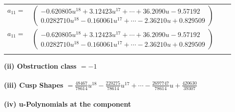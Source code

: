 \documentclass[1p]{elsarticle_modified}
\theoremstyle{definition}
\begin{document}
\begin{tabular}{m{7pt} m{180pt} m{7pt} m{180pt} }
\flushright $a_{11}=$&$\begin{pmatrix}-0.620805 u^{18}+3.12423 u^{17}+\cdots+36.2090 u-9.57192\\0.0282710 u^{18}-0.160061 u^{17}+\cdots-2.36210 u+0.829509\end{pmatrix}$\\ \flushright $a_{11}=$&$\begin{pmatrix}-0.620805 u^{18}+3.12423 u^{17}+\cdots+36.2090 u-9.57192\\0.0282710 u^{18}-0.160061 u^{17}+\cdots-2.36210 u+0.829509\end{pmatrix}$\\&\end{tabular}
\flushleft \textbf{(ii) Obstruction class $= -1$}\\~\\
\flushleft \textbf{(iii) Cusp Shapes $= \frac{48467}{78614} u^{18}-\frac{220275}{78614} u^{17}+\cdots-\frac{2697747}{78614} u+\frac{420630}{39307}$}\\~\\
\newpage\renewcommand{\arraystretch}{1}
\flushleft \textbf{(iv) u-Polynomials at the component}\newline \\
\end{document}
